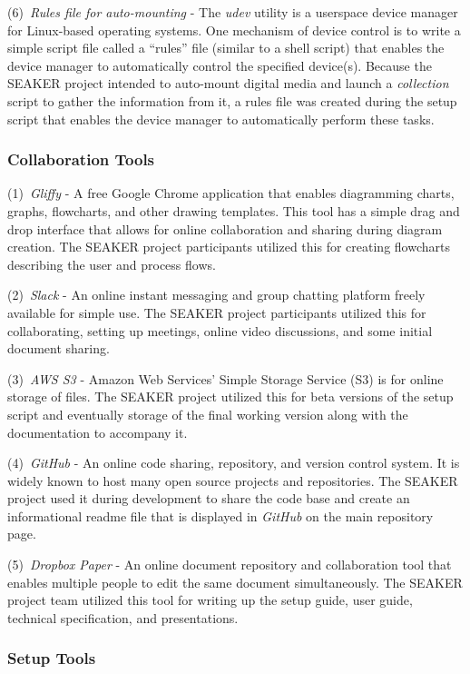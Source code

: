 \documentclass[12pt]{article}
\begin{document}
(6)~{\em Rules file for auto-mounting} - The {\em udev} utility 
is a userspace device manager for Linux-based operating systems. 
One mechanism of device control is to write a simple script file
called a ``rules'' file
(similar to a shell script) that enables the device manager
to automatically control the specified device(s).  Because 
the SEAKER project intended to auto-mount digital media and
launch a {\em collection} script to gather the information
from it, a rules file was created during the setup script
that enables the device manager to automatically perform
these tasks.

\subsubsection{Collaboration Tools}

(1)~{\em Gliffy} - A free Google Chrome application that enables diagramming
charts, graphs, flowcharts, and other drawing templates.  This tool
has a simple drag and drop interface that allows for online collaboration 
and sharing during diagram creation.  The SEAKER project participants
utilized this for creating flowcharts describing the user and process
flows.

(2)~{\em Slack} - An online instant messaging and group chatting platform
freely available for simple use.  The SEAKER project participants utilized
this for collaborating, setting up meetings, online video discussions, and
some initial document sharing.

(3)~{\em AWS S3} - Amazon Web Services' Simple Storage Service (S3) is for online
storage of files.  The SEAKER project utilized this for beta versions of
the setup script and eventually storage of the final working version along
with the documentation to accompany it.

(4)~{\em GitHub} - An online code sharing, repository, and version control
system.  It is widely known to host many open source projects and repositories.
The SEAKER project used it during development to share the code base and
create an informational readme file that is displayed in {\em GitHub} on
the main repository page.

(5)~{\em Dropbox Paper} - An online document repository and collaboration
tool that enables multiple people to edit the same document simultaneously.
The SEAKER project team utilized this tool for writing up the setup guide, 
user guide, technical specification, and presentations.

\subsubsection{Setup Tools}
\end{document}
